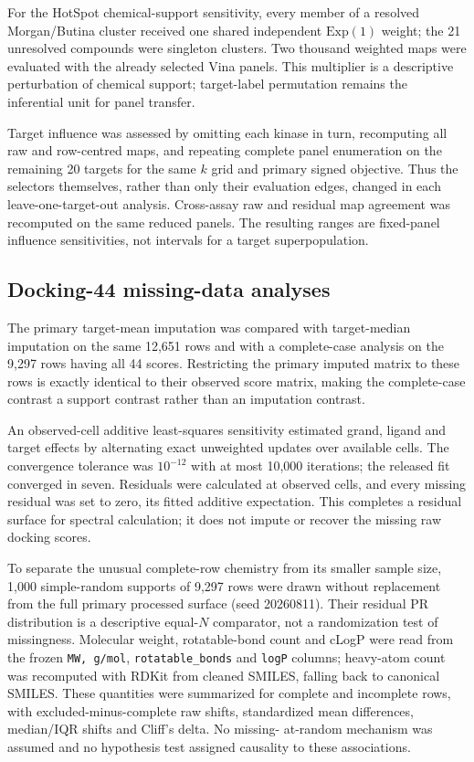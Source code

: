For the HotSpot chemical-support sensitivity, every member of a resolved
Morgan/Butina cluster received one shared independent $\mathrm{Exp}(1)$ weight;
the 21 unresolved compounds were singleton clusters. Two thousand weighted
maps were evaluated with the already selected Vina panels. This multiplier is a
descriptive perturbation of chemical support; target-label permutation remains
the inferential unit for panel transfer.

Target influence was assessed by omitting each kinase in turn, recomputing all
raw and row-centred maps, and repeating complete panel enumeration on the
remaining 20 targets for the same $k$ grid and primary signed objective. Thus
the selectors themselves, rather than only their evaluation edges, changed in
each leave-one-target-out analysis. Cross-assay raw and residual map agreement
was recomputed on the same reduced panels. The resulting ranges are fixed-panel
influence sensitivities, not intervals for a target superpopulation.

\subsection{Docking-44 missing-data analyses}

The primary target-mean imputation was compared with target-median imputation
on the same 12,651 rows and with a complete-case analysis on the 9,297 rows
having all 44 scores.  Restricting the primary imputed matrix to these rows is
exactly identical to their observed score matrix, making the complete-case
contrast a support contrast rather than an imputation contrast.

An observed-cell additive least-squares sensitivity estimated grand, ligand and
target effects by alternating exact unweighted updates over available cells.
The convergence tolerance was $10^{-12}$ with at most 10,000 iterations; the
released fit converged in seven.  Residuals were calculated at observed cells,
and every missing residual was set to zero, its fitted additive expectation.
This completes a residual surface for spectral calculation; it does not impute
or recover the missing raw docking scores.

To separate the unusual complete-row chemistry from its smaller sample size,
1,000 simple-random supports of 9,297 rows were drawn without replacement from
the full primary processed surface (seed 20260811).  Their residual PR
distribution is a descriptive equal-$N$ comparator, not a randomization test of
missingness.  Molecular weight, rotatable-bond count and cLogP were read from
the frozen \texttt{MW, g/mol}, \texttt{rotatable\_bonds} and \texttt{logP}
columns; heavy-atom count was recomputed with RDKit from cleaned SMILES,
falling back to canonical SMILES.  These quantities were summarized for
complete and incomplete rows, with excluded-minus-complete raw shifts,
standardized mean differences, median/IQR shifts and Cliff's delta.  No missing-
at-random mechanism was assumed and no hypothesis test assigned causality to
these associations.

